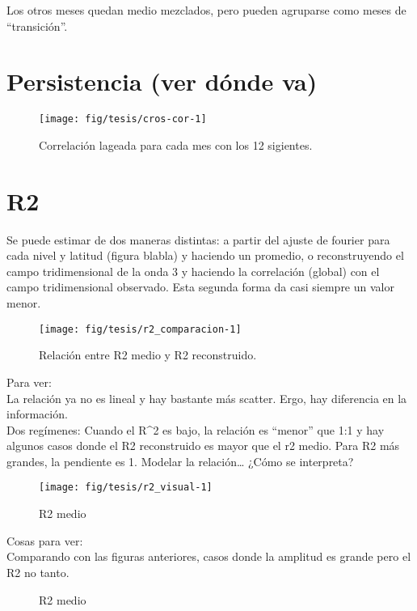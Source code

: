 \documentclass[spanish,a4paper]{book}
\begin{document}
Los otros meses quedan medio mezclados, pero pueden agruparse como meses
de ``transición''.

\section{Persistencia (ver dónde va)}\label{persistencia-ver-donde-va}

\begin{figure}
\texttt{[image: fig/tesis/cros-cor-1]} \caption{Correlación lageada para cada mes con los 12 sigientes.}\label{fig:cros-cor}
\end{figure}

\section{R2}\label{r2}

Se puede estimar de dos maneras distintas: a partir del ajuste de
fourier para cada nivel y latitud (figura blabla) y haciendo un
promedio, o reconstruyendo el campo tridimensional de la onda 3 y
haciendo la correlación (global) con el campo tridimensional observado.
Esta segunda forma da casi siempre un valor menor.

\begin{figure}
\texttt{[image: fig/tesis/r2\_comparacion-1]} \caption{Relación entre R2 medio y R2 reconstruido.}\label{fig:r2_comparacion}
\end{figure}

Para ver:\\
La relación ya no es lineal y hay bastante más scatter. Ergo, hay
diferencia en la información.\\
Dos regímenes: Cuando el R\^{}2 es bajo, la relación es ``menor'' que
1:1 y hay algunos casos donde el R2 reconstruido es mayor que el r2
medio. Para R2 más grandes, la pendiente es 1. Modelar la
relación\ldots{} ¿Cómo se interpreta?

\begin{figure*}
\texttt{[image: fig/tesis/r2\_visual-1]} \caption{R2 medio}\label{fig:r2_visual}
\end{figure*}

Cosas para ver:\\
Comparando con las figuras anteriores, casos donde la amplitud es grande
pero el R2 no tanto.

\begin{figure*}
\newline{}\caption{R2 medio}\label{fig:r2_timeseries}
\end{figure*}
\end{document}
